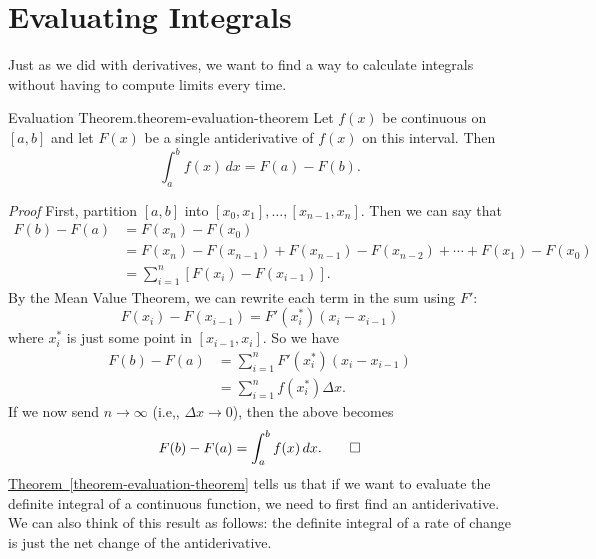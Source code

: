 \documentclass[10pt,]{book}
\makeatletter
\renewcommand*{\proofname}{Proof}
\renewenvironment{proof}[1][\proofname]{\par
  \pushQED{\qed}%
  \normalfont \topsep6\p@\@plus6\p@\relax
  \trivlist
  \item\relax
    {\itshape
    #1\@addpunct{.}}\hspace\labelsep\ignorespaces
}{%
  \popQED\endtrivlist\@endpefalse
}
\numberwithin{equation}{section}
\makeatother
\begin{document}
\section[{Evaluating Integrals}]{Evaluating Integrals}\label{section-evaluating-integrals}
\hypertarget{p-443}{}%
Just as we did with derivatives, we want to find a way to calculate integrals without having to compute limits every time.%
\begin{theorem}{Evaluation Theorem.}{}{theorem-evaluation-theorem}%
\hypertarget{p-444}{}%
Let \(f(x)\) be continuous on \([a,b]\) and let \(F(x)\) be a single antiderivative of \(f(x)\) on this interval. Then%
\begin{equation*}
\int_{a}^{b}f(x)\,dx = F(a) - F(b).
\end{equation*}
%
\end{theorem}
\begin{proof}\hypertarget{proof-10}{}
\hypertarget{p-445}{}%
First, partition \([a,b]\) into \([x_{0},x_{1}],\ldots,[x_{n-1},x_{n}]\). Then we can say that%
\begin{align*}
F(b) - F(a) & = F(x_{n}) - F(x_{0}) \\
& = F(x_{n}) - F(x_{n-1}) + F(x_{n-1}) - F(x_{n-2}) + \cdots + F(x_{1}) - F(x_{0}) \\
& = \sum_{i=1}^{n}[F(x_{i}) - F(x_{i-1})]. 
\end{align*}
By the Mean Value Theorem, we can rewrite each term in the sum using \(F'\):%
\begin{equation*}
F(x_{i}) - F(x_{i-1}) = F'(x_{i}^{*})(x_{i} - x_{i-1})
\end{equation*}
where \(x_{i}^{*}\) is just some point in \([x_{i-1},x_{i}]\). So we have%
\begin{align*}
F(b) - F(a) & = \sum_{i=1}^{n}F'(x_{i}^{*})(x_{i} - x_{i-1}) \\
& = \sum_{i=1}^{n}f(x_{i}^{*})\Delta x. 
\end{align*}
If we now send \(n\to\infty\) (i.e,, \(\Delta x\to 0\)), then the above becomes%
\begin{equation*}
F(b) - F(a) = \int_{a}^{b}f(x)\,dx.\qedhere
\end{equation*}
%
\end{proof}
\hypertarget{p-446}{}%
\hyperref[theorem-evaluation-theorem]{Theorem~\ref{theorem-evaluation-theorem}} tells us that if we want to evaluate the definite integral of a continuous function, we need to first find an antiderivative. We can also think of this result as follows: the definite integral of a rate of change is just the net change of the antiderivative.%
\end{document}
